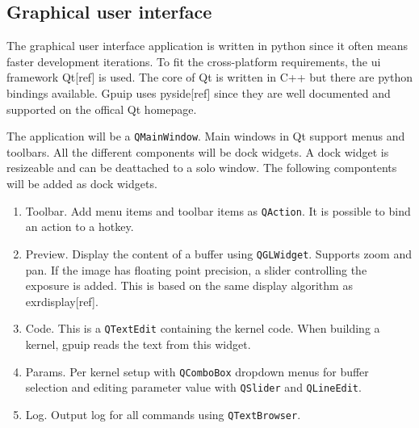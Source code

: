 \subsection{Graphical user interface}

The graphical user interface application is written in python since it often means faster development iterations. To fit the cross-platform requirements, the ui framework Qt[ref] is used. The core of Qt is written in C++ but there are python bindings available. Gpuip uses pyside[ref] since they are well documented and supported on the offical Qt homepage. 
\newline

The application will be a {\tt QMainWindow}. Main windows in Qt support menus and toolbars. All the different components will be dock widgets. A dock widget is resizeable and can be deattached to a solo window. The following compontents will be added as dock widgets.

\begin{enumerate}
\item Toolbar. Add menu items and toolbar items as {\tt QAction}. It is possible to bind an action to a hotkey.
\item Preview. Display the content of a buffer using {\tt QGLWidget}. Supports zoom and pan. If the image has floating point precision, a slider controlling the exposure is added. This is based on the same display algorithm as exrdisplay[ref].
\item Code. This is a {\tt QTextEdit} containing the kernel code. When building a kernel, gpuip reads the text from this widget.
\item Params. Per kernel setup with {\tt QComboBox} dropdown menus for buffer selection and editing parameter value with {\tt QSlider} and {\tt QLineEdit}.
\item Log. Output log for all commands using {\tt QTextBrowser}.
\end{enumerate}
